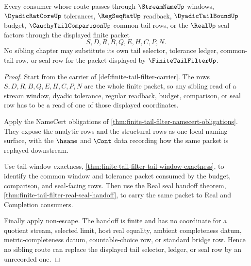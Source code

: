 \begin{theorem}
\label{thm:finite-tail-filter-sibling-tail-handoff}
Every consumer whose route passes through $\StreamNameUp$ windows, $\DyadicRatCoreUp$ tolerances, $\RegSeqRatUp$ readback, $\DyadicTailBoundUp$ budget, $\CauchyTailComparisonUp$ common-tail rows, or the $\RealUp$ seal factors through the displayed finite packet
$$
S,D,R,B,Q,E,H,C,P,N.
$$
No sibling chapter may substitute its own tail selector, tolerance ledger, common-tail row, or seal row for the packet displayed by $\FiniteTailFilterUp$.
\end{theorem}
\begin{proof}
Start from the carrier of \autoref{def:finite-tail-filter-carrier}. The rows $S,D,R,B,Q,E,H,C,P,N$ are the whole finite packet, so any sibling read of a stream window, dyadic tolerance, regular readback, budget, comparison, or seal row has to be a read of one of those displayed coordinates.

Apply the NameCert obligations of \autoref{thm:finite-tail-filter-namecert-obligations}. They expose the analytic rows and the structural rows as one local naming surface, with the $\hsame$ and $\Cont$ data recording how the same packet is replayed downstream.

Use tail-window exactness, \autoref{thm:finite-tail-filter-tail-window-exactness}, to identify the common window and tolerance packet consumed by the budget, comparison, and seal-facing rows. Then use the Real seal handoff theorem, \autoref{thm:finite-tail-filter-real-seal-handoff}, to carry the same packet to Real and Completion consumers.

Finally apply non-escape. The handoff is finite and has no coordinate for a quotient stream, selected limit, host real equality, ambient completeness datum, metric-completeness datum, countable-choice row, or standard bridge row. Hence no sibling route can replace the displayed tail selector, ledger, or seal row by an unrecorded one.
\end{proof}

